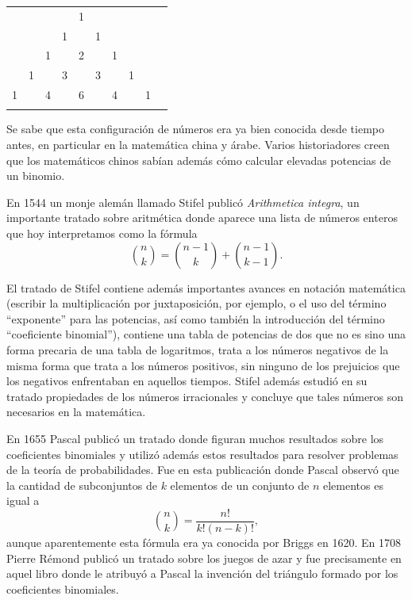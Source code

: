 \begin{center}
\begin{tabular}{rccccccccc}
    &    &    &    &  1\\\noalign{\smallskip\smallskip}
    &    &    &  1 &    &  1\\\noalign{\smallskip\smallskip}
    &    &  1 &    &  2 &    &  1\\\noalign{\smallskip\smallskip}
    &  1 &    &  3 &    &  3 &    &  1\\\noalign{\smallskip\smallskip}
  1 &    &  4 &    &  6 &    &  4 &    &  1\\\noalign{\smallskip\smallskip}
\end{tabular}
\end{center}

Se sabe que esta configuración de números era ya bien conocida desde tiempo antes, en
particular en la matemática china y árabe. Varios historiadores creen que los
matemáticos chinos sabían además cómo calcular elevadas potencias de un binomio. 

En 1544 un monje alemán llamado Stifel publicó \emph{Arithmetica integra}, un
importante tratado sobre aritmética donde aparece una lista de números enteros
que hoy interpretamos como la fórmula
\[
	\binom{n}{k}=\binom{n-1}{k}+\binom{n-1}{k-1}.
\]

El tratado de Stifel contiene además importantes avances en 
notación matemática (escribir la multiplicación por juxtaposición, por ejemplo,
o el uso del término ``exponente'' para las potencias, así como también
la introducción del término ``coeficiente binomial''), contiene una tabla de
potencias de dos que no es sino una forma precaria de una tabla de logaritmos,
trata a los números negativos de la misma forma que trata a los números
positivos, sin ninguno de los prejuicios que los negativos enfrentaban en
aquellos tiempos. Stifel además estudió en su tratado propiedades de los
números irracionales y concluye que tales números son necesarios en la
matemática. 

En 1655 Pascal publicó un tratado donde figuran muchos resultados sobre los
coeficientes binomiales y  utilizó además estos resultados para resolver
problemas de la teoría de probabilidades. Fue en esta publicación donde Pascal
observó que la cantidad de subconjuntos de $k$ elementos de un conjunto de $n$
elementos es igual a 
\[
	\binom{n}{k}=\frac{n!}{k!(n-k)!},
\]
aunque aparentemente esta fórmula era ya conocida por Briggs en 1620.  En 1708
Pierre Rémond publicó un tratado sobre los juegos de azar y fue precisamente en
aquel libro donde le atribuyó a Pascal la invención del triángulo formado por
los coeficientes binomiales. 

